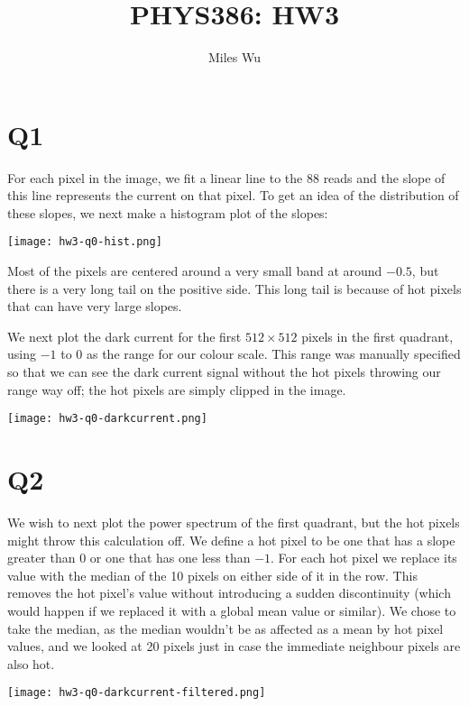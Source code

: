 \documentclass[12pt]{article}
\begin{document}
\title{PHYS386: HW3}
\author{Miles Wu}
\maketitle

\section{Q1}
For each pixel in the image, we fit a linear line to the 88 reads and the slope of this line represents the current on that pixel.
To get an idea of the distribution of these slopes, we next make a histogram plot of the slopes:

\begin{center}
\texttt{[image: hw3-q0-hist.png]}
\end{center}

Most of the pixels are centered around a very small band at around $-0.5$, but there is a very long tail on the positive side.
This long tail is because of hot pixels that can have very large slopes.

We next plot the dark current for the first $512 \times 512$ pixels in the first quadrant, using $-1$ to $0$ as the range for our colour scale.
This range was manually specified so that we can see the dark current signal without the hot pixels throwing our range way off; the hot pixels are simply clipped in the image.

\begin{center}
\texttt{[image: hw3-q0-darkcurrent.png]}
\end{center}

\section{Q2}
We wish to next plot the power spectrum of the first quadrant, but the hot pixels might throw this calculation off.
We define a hot pixel to be one that has a slope greater than $0$ or one that has one less than $-1$.
For each hot pixel we replace its value with the median of the 10 pixels on either side of it in the row.
This removes the hot pixel's value without introducing a sudden discontinuity (which would happen if we replaced it with a global mean value or similar).
We chose to take the median, as the median wouldn't be as affected as a mean by hot pixel values, and we looked at 20 pixels just in case the immediate neighbour pixels are also hot.
\begin{center}
\texttt{[image: hw3-q0-darkcurrent-filtered.png]}
\end{center}
\end{document}

